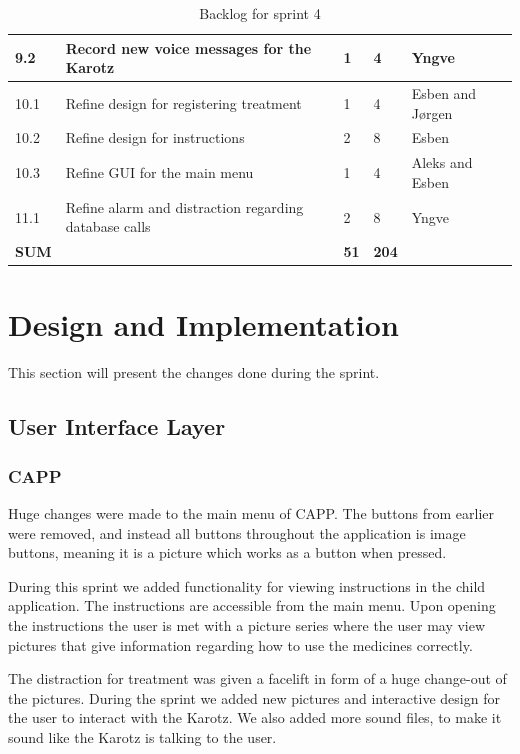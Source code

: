 \begin{table}
\begin{center}
\begin{tabular}{|p{2.0cm}| p{7.0cm}| p{2.0cm}|p{2.0cm}|p{2.0cm}|}
			\hline
			9.2 & Record new voice messages for the Karotz & 1 & 4 & Yngve\\
			\hline
			10.1 & Refine design for registering treatment & 1 & 4 & Esben and J\o rgen \\
			\hline
			10.2 & Refine design for instructions & 2 & 8 & Esben \\
			\hline
			10.3 & Refine GUI for the main menu & 1 & 4 & Aleks and Esben \\
			\hline
			11.1 & Refine alarm and distraction regarding database calls & 2 & 8 & Yngve\\
			\hline
			\bfseries{SUM} & & \bfseries{51} & \bfseries{204} & \\
			\hline
			\hline
		\end{tabular}
	\end{center}
	\caption{Backlog for sprint 4}
	\label{tab:sprint4backlog}
\end{table}

\section{Design and Implementation}
\label{sec:sprint4designAndImplementation}
This section will present the changes done during the sprint.

\subsection{User Interface Layer}

\subsubsection{CAPP}
Huge changes were made to the main menu of CAPP. The buttons from earlier were removed, and instead 
all buttons throughout the application is image buttons, meaning it is a picture which works 
as a button when pressed. 

During this sprint we added functionality for viewing instructions in the child application. 
The instructions are accessible from the main menu. Upon opening the instructions the user is 
met with a picture series where the user may view pictures that give information regarding how 
to use the medicines correctly.

The distraction for treatment was given a facelift in form of a huge change-out of the pictures. 
During the sprint we added new pictures and interactive design for the user to interact 
with the Karotz. We also added more sound files, to make it sound like the Karotz is talking 
to the user. 

